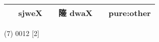 \documentclass[14pt,a4paper]{scrartcl}
\begin{document}
\begin{longtable}[c]{@{}llllll@{}}
\begin{minipage}[t]{0.14\columnwidth}\raggedright\strut
𢀡
\strut\end{minipage} &
\begin{minipage}[t]{0.14\columnwidth}\raggedright\strut
sjweX
\strut\end{minipage} &
\begin{minipage}[t]{0.14\columnwidth}\raggedright\strut
\strut\end{minipage} &
\begin{minipage}[t]{0.14\columnwidth}\raggedright\strut
隓 dwaX
\strut\end{minipage} &
\begin{minipage}[t]{0.14\columnwidth}\raggedright\strut
\strut\end{minipage} &
\begin{minipage}[t]{0.14\columnwidth}\raggedright\strut
pure:other
\strut\end{minipage}\tabularnewline
\bottomrule
\end{longtable}

(7) 0012 {[}2{]}
\end{document}
